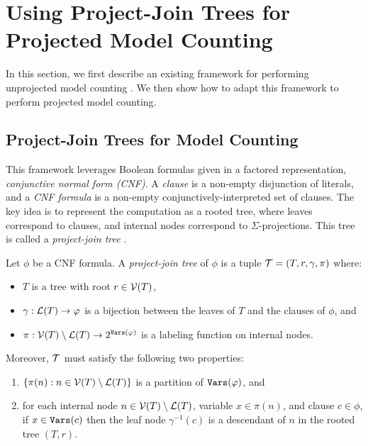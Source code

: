 







\section{Using Project-Join Trees for Projected Model Counting}
In this section, we first describe an existing framework for performing unprojected model counting \cite{dudek2020dpmc}. 
We then show how to adapt this framework to perform projected model counting.

\subsection{Project-Join Trees for Model Counting}
\label{sec_ungraded_trees}
This framework leverages Boolean formulas given in a factored representation, \emph{conjunctive normal form (CNF)}.
A \emph{clause} is a non-empty disjunction of literals, and a \emph{CNF formula} is a non-empty conjunctively-interpreted set of clauses.
The key idea is to represent the computation as a rooted tree, where leaves correspond to clauses, and internal nodes correspond to $\Sigma$-projections. 
This tree is called a \emph{project-join tree} \cite{dudek2020dpmc}.
\begin{definition}
\label{def_jointree_old}
    Let $\phi$ be a CNF formula.
    A \emph{project-join tree} of $\phi$ is a tuple $\mathcal{T} = (T, r, \gamma, \pi)$ where:
    \begin{itemize}
        \item $T$ is a tree with root $r \in \mathcal{V}(T)$,
        \item $\gamma: \mathcal{L}(T) \to \varphi$ is a bijection between the leaves of $T$ and the clauses of $\phi$, and
        \item $\pi: \mathcal{V}(T) \setminus \mathcal{L}(T) \to 2^{\texttt{\upshape Vars}(\varphi)}$ is a labeling function on internal nodes.
    \end{itemize}
    Moreover, $\mathcal{T}$ must satisfy the following two properties:
    \begin{enumerate}[ref=\arabic*]
        \item \label{prop_jointree_1} $\{\pi(n) : n \in \mathcal{V}(T) \setminus \mathcal{L}(T) \}$ is a partition of $\texttt{\upshape Vars}(\varphi)$, and
        \item \label{prop_jointree_2} for each internal node $n \in \mathcal{V}(T) \setminus \mathcal{L}(T)$, variable $x \in \pi(n)$, and clause $c \in \phi$, if $x \in \texttt{\upshape Vars}(c)$ then the leaf node $\gamma^{-1}(c)$ is a descendant of $n$ in the rooted tree $(T, r)$.
    \end{enumerate}
\end{definition}

